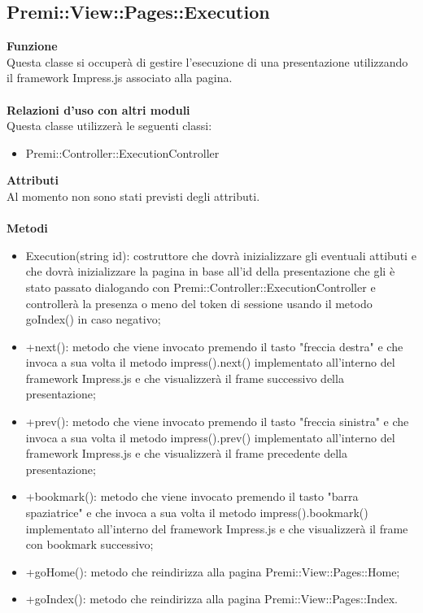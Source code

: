 {					\subsection{Premi::View::Pages::Execution}{
						\textbf{Funzione}\\
						\indent Questa classe si occuperà di gestire l'esecuzione di una presentazione utilizzando il framework Impress.js associato alla pagina.\\\\
						\textbf{Relazioni d'uso con altri moduli}\\
						\indent Questa classe utilizzerà le seguenti classi:
						\begin{itemize}
							\item Premi::Controller::ExecutionController
						\end{itemize}
						\textbf{Attributi}\\
						\indent Al momento non sono stati previsti degli attributi.\\\\
						\textbf{Metodi}
						\begin{itemize}
							\item Execution(string id): costruttore che dovrà inizializzare gli eventuali attibuti e che dovrà inizializzare la pagina in base all'id della presentazione che gli è stato passato dialogando con Premi::Controller::ExecutionController e controllerà la presenza o meno del token di sessione usando il metodo goIndex() in caso negativo;
							\item +next(): metodo che viene invocato premendo il tasto "freccia destra" e che invoca a sua volta il metodo impress().next() implementato all'interno del framework Impress.js e che visualizzerà il frame successivo della presentazione;
							\item +prev(): metodo che viene invocato premendo il tasto "freccia sinistra" e che invoca a sua volta il metodo impress().prev() implementato all'interno del framework Impress.js e che visualizzerà il frame precedente della presentazione;
							\item +bookmark(): metodo che viene invocato premendo il tasto "barra spaziatrice" e che invoca a sua volta il metodo impress().bookmark() implementato all'interno del framework Impress.js e che visualizzerà il frame con bookmark successivo;
							\item +goHome(): metodo che reindirizza alla pagina Premi::View::Pages::Home;
							\item +goIndex(): metodo che reindirizza alla pagina Premi::View::Pages::Index.
						\end{itemize}
					}
}
